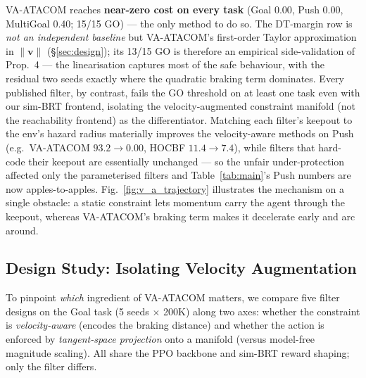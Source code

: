 \documentclass[letterpaper]{article}
\begin{document}
VA-ATACOM reaches \textbf{near-zero cost on every task} (Goal 0.00, Push 0.00, MultiGoal 0.40; 15/15 GO) --- the only method to do so. The DT-margin row is \emph{not an independent baseline} but VA-ATACOM's first-order Taylor approximation in $\|\boldsymbol v\|$ (\S\ref{sec:design}); its 13/15 GO is therefore an empirical side-validation of Prop.~4 --- the linearisation captures most of the safe behaviour, with the residual two seeds exactly where the quadratic braking term dominates. Every published filter, by contrast, fails the GO threshold on at least one task even with our sim-BRT frontend, isolating the velocity-augmented constraint manifold (not the reachability frontend) as the differentiator. Matching each filter's keepout to the env's hazard radius materially improves the velocity-aware methods on Push (e.g.\ VA-ATACOM $93.2{\to}0.00$, HOCBF $11.4{\to}7.4$), while filters that hard-code their keepout are essentially unchanged --- so the unfair under-protection affected only the parameterised filters and Table~\ref{tab:main}'s Push numbers are now apples-to-apples. Fig.~\ref{fig:v_a_trajectory} illustrates the mechanism on a single obstacle: a static constraint lets momentum carry the agent through the keepout, whereas VA-ATACOM's braking term makes it decelerate early and arc around.



\subsection{Design Study: Isolating Velocity Augmentation}
\label{sec:design-study}

To pinpoint \emph{which} ingredient of VA-ATACOM matters, we compare five filter designs on the Goal task (5 seeds $\times$ 200K) along two axes: whether the constraint is \emph{velocity-aware} (encodes the braking distance) and whether the action is enforced by \emph{tangent-space projection} onto a manifold (versus model-free magnitude scaling). All share the PPO backbone and sim-BRT reward shaping; only the filter differs.
\end{document}
